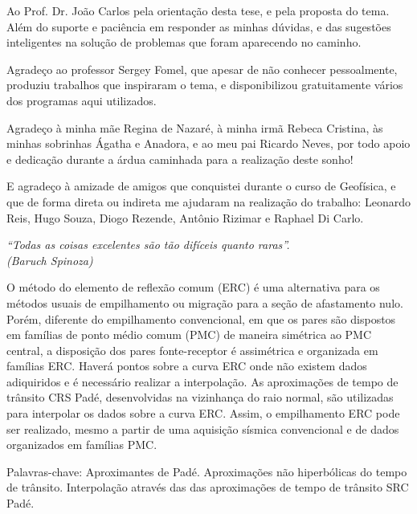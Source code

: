 \documentclass[
	12pt,				%
	openright,			%
	oneside,			%
	a4paper,			%
	english,			%
	brazil				%
	]{abntex2}
\begin{document}
\begin{agradecimentos}
\vspace*{1.5cm}

Ao Prof. Dr. João Carlos pela orientação desta tese, e pela proposta do tema. Além
do suporte e paciência em responder as minhas dúvidas, e das sugestões inteligentes na solução de problemas
que foram aparecendo no caminho.

Agradeço ao professor Sergey Fomel, que apesar de não conhecer pessoalmente, produziu trabalhos
que inspiraram o tema, e disponibilizou gratuitamente
vários
dos programas aqui utilizados.

Agradeço à minha mãe Regina de Nazaré,
à minha irmã Rebeca Cristina, às minhas sobrinhas Ágatha e Anadora, e ao meu pai Ricardo Neves, por todo apoio e dedicação
durante a árdua caminhada para a realização deste sonho!

E agradeço à amizade de amigos que conquistei durante o curso de Geofísica, e que de forma direta ou indireta
me ajudaram na realização do trabalho:
Leonardo Reis, Hugo Souza, Diogo Rezende, Antônio Rizimar e Raphael Di Carlo.

\end{agradecimentos}

\begin{epigrafe}
    \vspace*{\fill}
	\begin{flushright}
		\textit{``Todas as coisas excelentes são tão difíceis quanto raras''. \\
		(Baruch Spinoza)}
	\end{flushright}
\end{epigrafe}


\begin{resumo}
\OnehalfSpacing	%
O método do elemento de reflexão comum (ERC) é uma alternativa para os métodos
usuais de empilhamento ou migração para a seção de afastamento nulo. Porém, diferente do empilhamento 
convencional, em que os pares são dispostos em famílias de ponto médio comum (PMC) de maneira simétrica ao 
PMC central, a disposição dos pares fonte-receptor é assimétrica e organizada em famílias ERC. 
Haverá pontos sobre a curva ERC onde não existem dados adiquiridos e é necessário realizar a interpolação. 
As aproximações de tempo de trânsito CRS Padé, desenvolvidas na vizinhança do raio normal, são utilizadas 
para interpolar os dados sobre a curva ERC. Assim, o empilhamento ERC pode ser realizado, mesmo a partir de uma 
aquisição sísmica convencional e de dados organizados em famílias PMC.
 \vspace{\onelineskip} 
 \noindent
 \par Palavras-chave: Aproximantes de Padé. Aproximações não hiperbólicas do tempo de trânsito. 
 Interpolação através das das aproximações de tempo de trânsito SRC Padé. 
\end{resumo}
\end{document}
